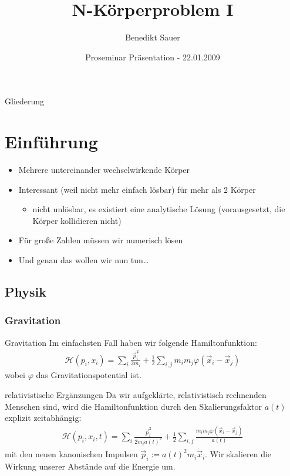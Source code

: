 \documentclass{beamer}
\title[N-Körperproblem I]{N-Körperproblem I}
\author[B. Sauer]{Benedikt Sauer}
\institute{}
\date[Proseminar Präsentation]{Proseminar Präsentation - 22.01.2009}
\begin{document}
\begin{frame}
  \titlepage
\end{frame}

\begin{frame}{Gliederung}
  \tableofcontents[pausesections]
\end{frame}


\section{Einführung}
\begin{frame}
  \begin{itemize}
    \item Mehrere untereinander wechselwirkende Körper
    \item Interessant (weil nicht mehr einfach lösbar) für mehr als 2 Körper
      \begin{itemize}
        \item \alert{nicht} unlösbar, es existiert eine analytische Lösung
          (vorausgesetzt, die Körper kollidieren nicht)
      \end{itemize}
    \item Für große Zahlen müssen wir numerisch lösen
  \end{itemize}
  \vskip10pt
  \begin{itemize}
    \item Und genau das wollen wir nun tun\ldots
  \end{itemize}
\end{frame}
\subsection{Physik}
\subsubsection*{Gravitation}
\begin{frame}{Gravitation}
  Im einfachsten Fall haben wir folgende Hamiltonfunktion:
  \begin{align}
    \mathcal H(p_i,x_i) = \sum_i \frac{\vec{p}_i^2}{2m_i} +
    \frac{1}{2}\sum_{i,j} {m_i m_j \varphi(\vec{x}_i - \vec{x}_j)}
    \label{eqn:hamilton}
  \end{align}
  wobei $\varphi$ das Gravitationspotential ist.
\end{frame}
\begin{frame}{relativistische Ergänzungen}
  Da wir aufgeklärte, relativistisch rechnenden Menschen sind, wird die
  Hamiltonfunktion durch den Skalierungsfaktor $a(t)$ explizit zeitabhängig:
  \begin{align}
    \mathcal H(p_i,x_i,t) = \sum_i \frac{\vec{p}_i^2}{2m_i a(t)^2} +
    \frac{1}{2}\sum_{i,j} \frac{m_i m_j \varphi(\vec{x}_i - \vec{x}_j)}{a(t)}
    \label{eqn:hamilton_rel}
  \end{align}
  mit den neuen kanonischen Impulsen $\vec p_i := a(t)^2 m_i\dot\vec{x}_i$.
  Wir skalieren die Wirkung unserer Abstände auf die Energie um.
\end{frame}
\end{document}
